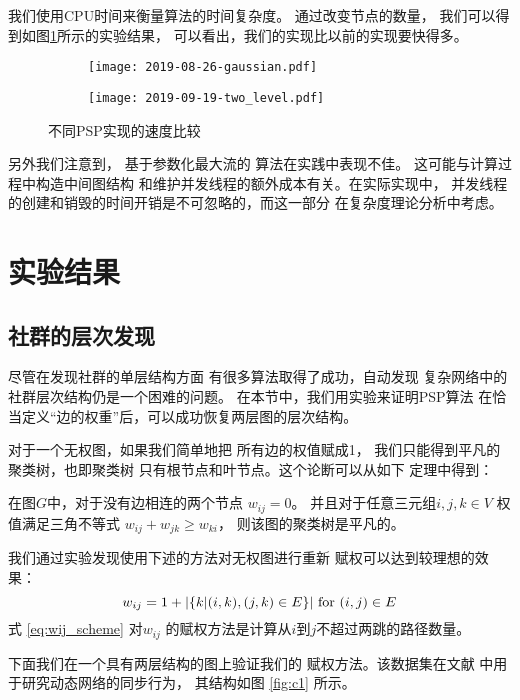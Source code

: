 我们使用CPU时间来衡量算法的时间复杂度。
通过改变节点的数量，
我们可以得到如图\ref{fig:esc}所示的实验结果，
可以看出，我们的实现比以前的实现要快得多。
\begin{figure}
	\centering
	\begin{subfigure}{0.45\textwidth}
		\texttt{[image: 2019-08-26-gaussian.pdf]}
	\end{subfigure}
	\begin{subfigure}{0.45\textwidth}
		\texttt{[image: 2019-09-19-two\_level.pdf]}
	\end{subfigure}
	\caption{
  不同PSP实现的速度比较}\label{fig:esc}
\end{figure}

另外我们注意到，
基于参数化最大流的
算法\citep{kolmogorov}在实践中表现不佳。
这可能与计算过程中构造中间图结构
和维护并发线程的额外成本有关。在实际实现中，
并发线程的创建和销毁的时间开销是不可忽略的，而这一部分
在复杂度理论分析中考虑。

\section{实验结果}
\subsection{社群的层次发现}
\label{subsec:cd}
尽管在发现社群的单层结构方面
有很多算法取得了成功，自动发现
复杂网络中的社群层次结构仍是一个困难的问题。
在本节中，我们用实验来证明PSP算法
在恰当定义“边的权重”后，可以成功恢复两层图的层次结构。

对于一个无权图，如果我们简单地把
所有边的权值赋成1，
我们只能得到平凡的聚类树，也即聚类树
只有根节点和叶节点。这个论断可以从如下
定理中得到：
\begin{theorem}\label{thm:triangle}
  在图$G$中，对于没有边相连的两个节点 $w_{ij}=0$。
  并且对于任意三元组$i,j,k \in V$ 权值满足三角不等式 
  $w_{ij} + w_{jk} \geq w_{ki}$，
  则该图的聚类树是平凡的。
\end{theorem}
  
我们通过实验发现使用下述的方法对无权图进行重新
赋权可以达到较理想的效果：
\begin{equation}\label{eq:wij_scheme}
    w_{ij} = 1 + \lvert\{k | (i,k),(j,k) \in E \}\rvert \textrm{ for } (i,j) \in E
\end{equation}
式 \eqref{eq:wij_scheme} 对$w_{ij}$
的赋权方法是计算从$i$到$j$不超过两跳的路径数量。

下面我们在一个具有两层结构的图上验证我们的
赋权方法。该数据集在文献
\cite{RN22} 中用于研究动态网络的同步行为，
其结构如图 \ref{fig:c1} 所示。 

